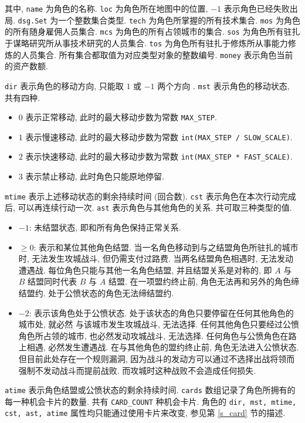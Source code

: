 \documentclass[UTF8, zihao=-4]{ctexart} %
\newcommand{\lcode}{\lstinline} % 段内插入代码
\begin{document}
其中, \lcode{name} 为角色的名称. \lcode{loc} 为角色所在地图中的位置, $-1$ 表示角色已经失败出局.
\lcode{dsg.Set} 为一个整数集合类型. \lcode{tech} 为角色所掌握的所有技术集合.
\lcode{mos} 为角色的所有随身雇佣人员集合. \lcode{mcs} 为角色的所有占领城市的集合.
\lcode{sos} 为角色所有驻扎于谋略研究所从事技术研究的人员集合.
\lcode{tos} 为角色所有驻扎于修炼所从事能力修炼的人员集合.
所有集合都取值为对应类型对象的整数编号. \lcode{money} 表示角色当前的资产数额.

\lcode{dir} 表示角色的移动方向, 只能取 $1$ 或 $-1$ 两个方向 .
\lcode{mst} 表示角色的移动状态, 共有四种. 
\begin{itemize}
    \item $0$ 表示正常移动, 此时的最大移动步数为常数 \lcode{MAX_STEP}.
    \item $1$ 表示慢速移动, 此时的最大移动步数为常数 \lcode{int(MAX_STEP / SLOW_SCALE)}.
    \item $2$ 表示快速移动, 此时的最大移动步数为常数 \lcode{int(MAX_STEP * FAST_SCALE)}.
    \item $3$ 表示禁止移动, 此时角色只能原地停留.
\end{itemize}
\lcode{mtime} 表示上述移动状态的剩余持续时间 (回合数). 
\lcode{cst} 表示角色在本次行动完成后, 可以再连续行动一次. 
\lcode{ast} 表示角色与其他角色的关系. 共可取三种类型的值.
\begin{itemize}
    \item $-1$: 未结盟状态, 即和所有角色保持正常关系.
    \item $\ge 0$: 表示和某位其他角色结盟. 当一名角色移动到与之结盟角色所驻扎的城市时, 无法发生攻城战斗, 
        但仍需支付过路费. 当两名结盟角色相遇时, 无法发动遭遇战. 
        每位角色只能与其他一名角色结盟, 并且结盟关系是对称的, 即 $A$ 与 $B$ 结盟同时代表 $B$ 与 $A$ 结盟.
        在一项盟约终止前, 角色无法再和另外的角色缔结盟约. 处于公愤状态的角色无法缔结盟约.
    \item $-2$: 表示该角色处于公愤状态. 处于该状态的角色只要停留在任何其他角色的城市处, 就必然
        与该城市发生攻城战斗, 无法选择. 任何其他角色只要经过公愤角色所占领的城市, 也必然发动攻城战斗, 无法选择.
        任何角色与公愤角色在路上相遇, 必然发生遭遇战. 在与其他角色的盟约终止前, 角色无法进入公愤状态. 
        但目前此处存在一个规则漏洞, 因为战斗的发动方可以通过不选择出战将领而强制不发动战斗而提前战败.
        而攻城时这种战败不会造成任何损失.
\end{itemize}
\lcode{atime} 表示角色结盟或公愤状态的剩余持续时间. \lcode{cards} 数组记录了角色所拥有的每一种机会卡片的数量.
共有 \lcode{CARD_COUNT} 种机会卡片. 
角色的 \lcode{dir, mst, mtime, cst, ast, atime} 属性均只能通过使用卡片来改变, 参见第 \ref{s_card} 节的描述. 
\end{document}
